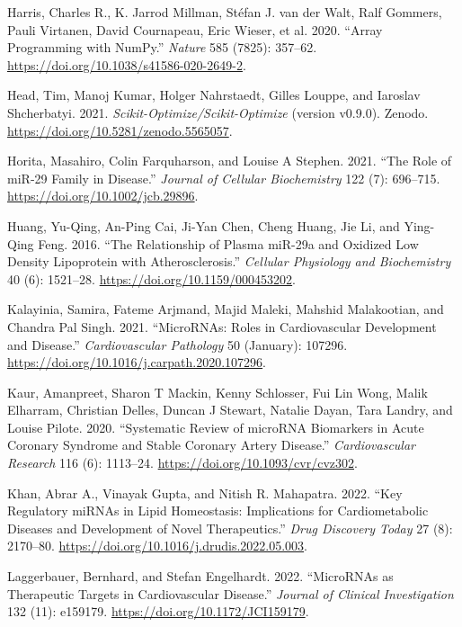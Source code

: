 \documentclass[smallextended]{svjour3}       %
\newlength{\cslhangindent}
\newlength{\cslentryspacingunit} %
\newenvironment{CSLReferences}[2] %
 {%
  \setlength{\parindent}{0pt}
  \ifodd #1
  \let\oldpar\par
  \def\par{\hangindent=\cslhangindent\oldpar}
  \fi
  \setlength{\parskip}{#2\cslentryspacingunit}
 }%
 {}
\begin{document}
\begin{CSLReferences}{1}{0}
\leavevmode{}%
Harris, Charles R., K. Jarrod Millman, Stéfan J. van der Walt, Ralf
Gommers, Pauli Virtanen, David Cournapeau, Eric Wieser, et al. 2020.
{``Array Programming with {NumPy}.''} \emph{Nature} 585 (7825): 357--62.
\url{https://doi.org/10.1038/s41586-020-2649-2}.

\leavevmode{}%
Head, Tim, Manoj Kumar, Holger Nahrstaedt, Gilles Louppe, and Iaroslav
Shcherbatyi. 2021. \emph{Scikit-Optimize/Scikit-Optimize} (version
v0.9.0). Zenodo. \url{https://doi.org/10.5281/zenodo.5565057}.

\leavevmode{}%
Horita, Masahiro, Colin Farquharson, and Louise A Stephen. 2021. {``The
Role of {miR}‐29 Family in Disease.''} \emph{Journal of Cellular
Biochemistry} 122 (7): 696--715.
\url{https://doi.org/10.1002/jcb.29896}.

\leavevmode{}%
Huang, Yu-Qing, An-Ping Cai, Ji-Yan Chen, Cheng Huang, Jie Li, and
Ying-Qing Feng. 2016. {``The {Relationship} of {Plasma} {miR}-29a and
{Oxidized} {Low} {Density} {Lipoprotein} with {Atherosclerosis}.''}
\emph{Cellular Physiology and Biochemistry} 40 (6): 1521--28.
\url{https://doi.org/10.1159/000453202}.

\leavevmode{}%
Kalayinia, Samira, Fateme Arjmand, Majid Maleki, Mahshid Malakootian,
and Chandra Pal Singh. 2021. {``{MicroRNAs}: Roles in Cardiovascular
Development and Disease.''} \emph{Cardiovascular Pathology} 50
(January): 107296. \url{https://doi.org/10.1016/j.carpath.2020.107296}.

\leavevmode{}%
Kaur, Amanpreet, Sharon T Mackin, Kenny Schlosser, Fui Lin Wong, Malik
Elharram, Christian Delles, Duncan J Stewart, Natalie Dayan, Tara
Landry, and Louise Pilote. 2020. {``Systematic Review of {microRNA}
Biomarkers in Acute Coronary Syndrome and Stable Coronary Artery
Disease.''} \emph{Cardiovascular Research} 116 (6): 1113--24.
\url{https://doi.org/10.1093/cvr/cvz302}.

\leavevmode{}%
Khan, Abrar A., Vinayak Gupta, and Nitish R. Mahapatra. 2022. {``Key
Regulatory {miRNAs} in Lipid Homeostasis: {Implications} for
Cardiometabolic Diseases and Development of Novel Therapeutics.''}
\emph{Drug Discovery Today} 27 (8): 2170--80.
\url{https://doi.org/10.1016/j.drudis.2022.05.003}.

\leavevmode{}%
Laggerbauer, Bernhard, and Stefan Engelhardt. 2022. {``{MicroRNAs} as
Therapeutic Targets in Cardiovascular Disease.''} \emph{Journal of
Clinical Investigation} 132 (11): e159179.
\url{https://doi.org/10.1172/JCI159179}.


\end{CSLReferences}
\end{document}
